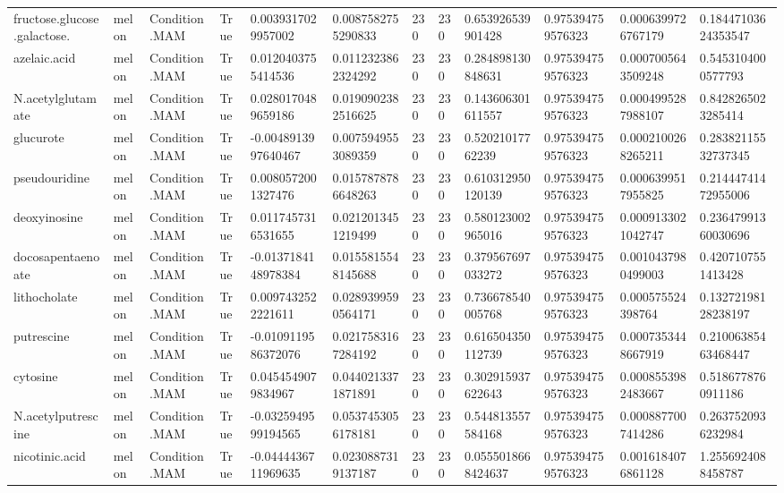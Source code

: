 \begin{longtable}{llllllllllll}
fructose.glucose.galactose. & melon & Condition.MAM & True & 0.0039317029957002 & 0.0087582755290833 & 230 & 230 & 0.653926539901428 & 0.975394759576323 & 0.0006399726767179 & 0.18447103624353547 \\
azelaic.acid & melon & Condition.MAM & True & 0.0120403755414536 & 0.0112323862324292 & 230 & 230 & 0.284898130848631 & 0.975394759576323 & 0.0007005643509248 & 0.5453104000577793 \\
N.acetylglutamate & melon & Condition.MAM & True & 0.0280170489659186 & 0.0190902382516625 & 230 & 230 & 0.143606301611557 & 0.975394759576323 & 0.0004995287988107 & 0.8428265023285414 \\
glucurote & melon & Condition.MAM & True & -0.0048913997640467 & 0.0075949553089359 & 230 & 230 & 0.52021017762239 & 0.975394759576323 & 0.0002100268265211 & 0.28382115532737345 \\
pseudouridine & melon & Condition.MAM & True & 0.0080572001327476 & 0.0157878786648263 & 230 & 230 & 0.610312950120139 & 0.975394759576323 & 0.0006399517955825 & 0.21444741472955006 \\
deoxyinosine & melon & Condition.MAM & True & 0.0117457316531655 & 0.0212013451219499 & 230 & 230 & 0.580123002965016 & 0.975394759576323 & 0.0009133021042747 & 0.23647991360030696 \\
docosapentaenoate & melon & Condition.MAM & True & -0.0137184148978384 & 0.0155815548145688 & 230 & 230 & 0.379567697033272 & 0.975394759576323 & 0.0010437980499003 & 0.4207107551413428 \\
lithocholate & melon & Condition.MAM & True & 0.0097432522221611 & 0.0289399590564171 & 230 & 230 & 0.736678540005768 & 0.975394759576323 & 0.000575524398764 & 0.13272198128238197 \\
putrescine & melon & Condition.MAM & True & -0.0109119586372076 & 0.0217583167284192 & 230 & 230 & 0.616504350112739 & 0.975394759576323 & 0.0007353448667919 & 0.21006385463468447 \\
cytosine & melon & Condition.MAM & True & 0.0454549079834967 & 0.0440213371871891 & 230 & 230 & 0.302915937622643 & 0.975394759576323 & 0.0008553982483667 & 0.5186778760911186 \\
N.acetylputrescine & melon & Condition.MAM & True & -0.0325949599194565 & 0.0537453056178181 & 230 & 230 & 0.544813557584168 & 0.975394759576323 & 0.0008877007414286 & 0.2637520936232984 \\
nicotinic.acid & melon & Condition.MAM & True & -0.0444436711969635 & 0.0230887319137187 & 230 & 230 & 0.0555018668424637 & 0.975394759576323 & 0.0016184076861128 & 1.2556924088458787 \\

\end{longtable}
